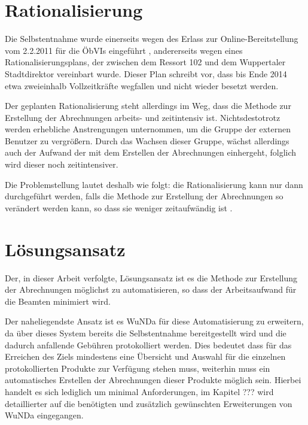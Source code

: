 \section{Rationalisierung}
Die Selbstentnahme wurde einerseits wegen des Erlass zur Online-Bereitstellung vom 2.2.2011 für die \acp{ÖbVI} eingeführt \autocite[vgl.][]{wupp-wunda-oebvi}, andererseits wegen eines Rationalisierungsplans, der zwischen dem Ressort 102 und dem Wuppertaler Stadtdirektor vereinbart wurde.
Dieser Plan schreibt vor, dass bis Ende 2014 etwa zweieinhalb  Vollzeitkräfte wegfallen und nicht wieder besetzt werden.

Der geplanten Rationalisierung steht allerdings im Weg, dass die Methode zur Erstellung der Abrechnungen arbeits- und zeitintensiv ist.
Nichtsdestotrotz werden erhebliche Anstrengungen unternommen, um die Gruppe der externen Benutzer zu vergrößern.
Durch das Wachsen dieser Gruppe, wächst allerdings auch der Aufwand der mit dem Erstellen der Abrechnungen einhergeht, folglich wird dieser noch zeitintensiver.

Die Problemstellung lautet deshalb wie folgt: die Rationalisierung kann nur dann durchgeführt werden, falls die Methode zur Erstellung der Abrechnungen so verändert werden kann, so dass sie weniger zeitaufwändig ist \autocite[vgl.][]{sander-abrechnung}. 


\section{Lösungsansatz}

Der, in dieser Arbeit verfolgte, Lösungsansatz ist es die Methode zur Erstellung der Abrechnungen möglichst zu automatisieren, so dass der Arbeitsaufwand für die Beamten minimiert wird. 

Der naheliegendste Ansatz ist es \acs{WuNDa} für diese Automatisierung zu erweitern, da über dieses System bereits die Selbstentnahme bereitgestellt wird und die dadurch anfallende Gebühren protokolliert werden. Dies bedeutet dass für das Erreichen des Ziels mindestens eine Übersicht und Auswahl für die einzelnen protokollierten Produkte zur Verfügung stehen muss, weiterhin muss ein automatisches Erstellen der Abrechnungen dieser Produkte möglich sein. Hierbei handelt es sich lediglich um minimal Anforderungen, im Kapitel ??? wird detaillierter auf die benötigten und zusätzlich gewünschten Erweiterungen von \ac{WuNDa} eingegangen. 

